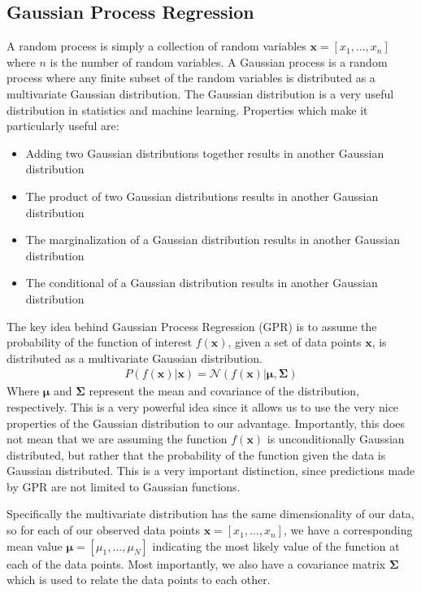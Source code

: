 \subsection{Gaussian Process Regression}

A random process is simply a collection of random variables $\textbf{x} = [x_1, ..., x_n]$ where $n$ is the number of random variables. A Gaussian process is a random process where any finite subset of the random variables is distributed as a multivariate Gaussian distribution.
The Gaussian distribution is a very useful distribution in statistics and machine learning. Properties which make it particularly useful are:
\begin{itemize}
    \item Adding two Gaussian distributions together results in another Gaussian distribution
    \item The product of two Gaussian distributions results in another Gaussian distribution
    \item The marginalization of a Gaussian distribution results in another Gaussian distribution
    \item The conditional of a Gaussian distribution results in another Gaussian distribution
\end{itemize}

The key idea behind Gaussian Process Regression (GPR) is to assume the probability of the function of interest $f(\textbf{x})$, given a set of data points $\textbf{x}$, is distributed as a multivariate Gaussian distribution.
\begin{align}
    P(f(\textbf{x})|\textbf{x}) = \mathcal{N}(f(\textbf{x})|\boldsymbol{\mu},\boldsymbol{\Sigma})
\end{align}
Where $\boldsymbol{\mu}$ and $\boldsymbol{\Sigma}$ represent the mean and covariance of the distribution, respectively. This is a very powerful idea since it allows us to use the very nice properties of the Gaussian distribution to our advantage. Importantly, this does not mean that we are assuming the function $f(\textbf{x})$ is unconditionally Gaussian distributed, but rather that the probability of the function given the data is Gaussian distributed. This is a very important distinction, since
predictions made by GPR are not limited to Gaussian functions. 

Specifically the multivariate distribution has the same dimensionality of our data, so for each of our observed data points $\textbf{x} = [x_1, ..., x_n]$, we have a corresponding mean value 
$\boldsymbol{\mu} = [\mu_1, ..., \mu_N]$ indicating the most likely value of the function at each of the data points. Most importantly, we also have a covariance matrix $\boldsymbol{\Sigma}$ which is used to relate the data points to each other. 

